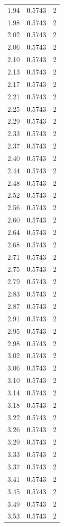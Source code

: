 \begin{longtable}{lrr}
  1.94 & 0.5743 & 2 \\
  1.98 & 0.5743 & 2 \\
  2.02 & 0.5743 & 2 \\
  2.06 & 0.5743 & 2 \\
  2.10 & 0.5743 & 2 \\
  2.13 & 0.5743 & 2 \\
  2.17 & 0.5743 & 2 \\
  2.21 & 0.5743 & 2 \\
  2.25 & 0.5743 & 2 \\
  2.29 & 0.5743 & 2 \\
  2.33 & 0.5743 & 2 \\
  2.37 & 0.5743 & 2 \\
  2.40 & 0.5743 & 2 \\
  2.44 & 0.5743 & 2 \\
  2.48 & 0.5743 & 2 \\
  2.52 & 0.5743 & 2 \\
  2.56 & 0.5743 & 2 \\
  2.60 & 0.5743 & 2 \\
  2.64 & 0.5743 & 2 \\
  2.68 & 0.5743 & 2 \\
  2.71 & 0.5743 & 2 \\
  2.75 & 0.5743 & 2 \\
  2.79 & 0.5743 & 2 \\
  2.83 & 0.5743 & 2 \\
  2.87 & 0.5743 & 2 \\
  2.91 & 0.5743 & 2 \\
  2.95 & 0.5743 & 2 \\
  2.98 & 0.5743 & 2 \\
  3.02 & 0.5743 & 2 \\
  3.06 & 0.5743 & 2 \\
  3.10 & 0.5743 & 2 \\
  3.14 & 0.5743 & 2 \\
  3.18 & 0.5743 & 2 \\
  3.22 & 0.5743 & 2 \\
  3.26 & 0.5743 & 2 \\
  3.29 & 0.5743 & 2 \\
  3.33 & 0.5743 & 2 \\
  3.37 & 0.5743 & 2 \\
  3.41 & 0.5743 & 2 \\
  3.45 & 0.5743 & 2 \\
  3.49 & 0.5743 & 2 \\
  3.53 & 0.5743 & 2 \\

\end{longtable}
